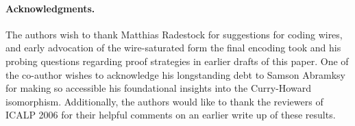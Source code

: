 \paragraph{Acknowledgments.}
The authors wish to thank Matthias Radestock for suggestions for
coding wires, and early advocation of the wire-saturated form the
final encoding took and his probing questions regarding proof
strategies in earlier drafts of this paper. One of the co-author
wishes to acknowledge his longstanding debt to Samson Abramksy for
making so accessible his foundational insights into the Curry-Howard
isomorphism. Additionally, the authors would like to thank the
reviewers of ICALP 2006 for their helpful comments on an earlier write
up of these results.
